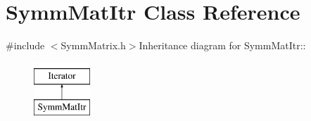 \hypertarget{classJKBuilder_1_1SymmMatItr}{
\section{SymmMatItr Class Reference}
\label{classJKBuilder_1_1SymmMatItr}
}


{\ttfamily \#include $<$SymmMatrix.h$>$}Inheritance diagram for SymmMatItr::\begin{figure}[H]
\begin{center}
\leavevmode
\includegraphics[height=2cm]{classJKBuilder_1_1SymmMatItr}
\end{center}
\end{figure}
